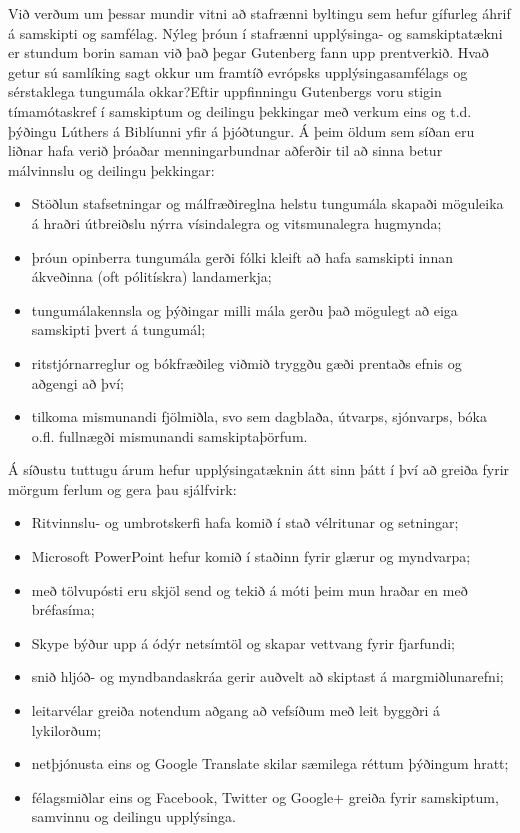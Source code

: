 \documentclass{../../metanetpaper}
\begin{document}
\begin{multicols}{2}

Við verðum um þessar mundir vitni að stafrænni byltingu sem hefur gífurleg áhrif á samskipti og samfélag. Nýleg þróun í stafrænni upplýsinga- og samskiptatækni er stundum borin saman við það þegar Gutenberg fann upp prentverkið. Hvað getur sú samlíking sagt okkur um framtíð evrópsks upplýsingasamfélags og sérstaklega tungumála okkar?Eftir uppfinningu Gutenbergs voru stigin tímamótaskref í samskiptum og deilingu þekkingar með verkum eins og t.d. þýðingu Lúthers á Biblíunni yfir á þjóðtungur. Á þeim öldum sem síðan eru liðnar hafa verið þróaðar menningarbundnar aðferðir til að sinna betur málvinnslu og deilingu þekkingar:

\begin{itemize}
\item Stöðlun stafsetningar og málfræðireglna helstu tungumála skapaði möguleika á hraðri útbreiðslu nýrra vísindalegra og vitsmunalegra hugmynda;
\item þróun opinberra tungumála gerði fólki kleift að hafa samskipti innan ákveðinna (oft pólitískra) landamerkja;
\item tungumálakennsla og þýðingar milli mála gerðu það mögulegt að eiga samskipti þvert á tungumál;
\item ritstjórnarreglur og bókfræðileg viðmið tryggðu gæði prentaðs efnis og aðgengi að því;
\item tilkoma mismunandi fjölmiðla, svo sem dagblaða, útvarps, sjónvarps, bóka o.fl. fullnægði mismunandi samskiptaþörfum.
\end{itemize}

Á síðustu tuttugu árum hefur upplýsingatæknin átt sinn þátt í því að greiða fyrir mörgum ferlum og gera þau sjálfvirk:

\begin{itemize}
\item Ritvinnslu- og umbrotskerfi hafa komið í stað vélritunar og setningar;
\item Microsoft PowerPoint hefur komið í staðinn fyrir glærur og myndvarpa;
\item með tölvupósti eru skjöl send og tekið á móti þeim mun hraðar en með bréfasíma;
\item Skype býður upp á ódýr netsímtöl og skapar vettvang fyrir fjarfundi;
\item snið hljóð- og myndbandaskráa gerir auðvelt að skiptast á margmiðlunarefni;
\item leitarvélar greiða notendum aðgang að vefsíðum með leit byggðri á lykilorðum;
\item netþjónusta eins og Google Translate skilar sæmilega réttum þýðingum hratt;
\item félagsmiðlar eins og Facebook, Twitter og Google+ greiða fyrir samskiptum, samvinnu og deilingu upplýsinga. 
\end{itemize}


\end{multicols}
\end{document}
